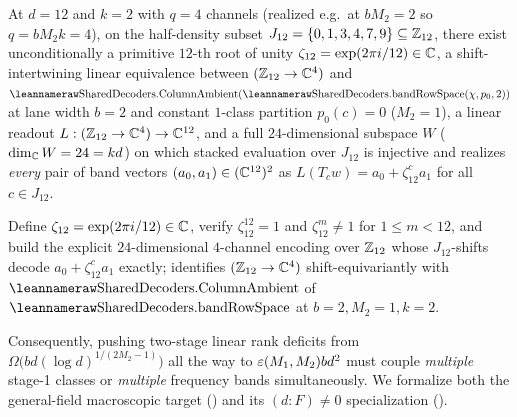 \begin{example}[Unconditional $d = 12$ single-class band witness over $\C$]\label{ex:d12-band}
At $d = 12$ and $k = 2$ with $q = 4$ channels (realized e.g.\ at $b M_2 = 2$ so $q = b M_2 k = 4$),
on the half-density subset $J_{12} = \{0, 1, 3, 4, 7, 9\} \subseteq \mathbb{Z}_{12}$, there exist
unconditionally a primitive $12$-th root of unity $\zeta_{12} = \exp(2\pi i / 12) \in \mathbb{C}$, a
shift-intertwining linear equivalence between $(\mathbb{Z}_{12} \to \mathbb{C}^4)$ and
$\leanname{SharedDecoders.ColumnAmbient}(\leanname{SharedDecoders.bandRowSpace}(\chi, p_0, 2))$
at lane width $b = 2$ and constant $1$-class partition $p_0(c) = 0$ ($M_2 = 1$), a linear readout
$L : (\mathbb{Z}_{12} \to \mathbb{C}^4) \to \mathbb{C}^{12}$, and a full $24$-dimensional subspace $W$ ($\dim_{\mathbb{C}} W = 24 =
kd$) on which stacked evaluation over $J_{12}$ is injective and realizes \emph{every} pair of band
vectors $(a_0, a_1) \in (\mathbb{C}^{12})^2$ as $L(T_c w) = a_0 + \zeta_{12}^c a_1$ for all $c \in J_{12}$.
\end{example}
\begin{outline}
Define $\zeta_{12} = \exp(2\pi i / 12) \in \mathbb{C}$, verify $\zeta_{12}^{12} = 1$ and $\zeta_{12}^m \ne 1$
for $1 \le m < 12$, and build the explicit $24$-dimensional $4$-channel encoding over $\mathbb{Z}_{12}$
whose $J_{12}$-shifts decode $a_0 + \zeta_{12}^c a_1$ exactly;
 identifies $(\mathbb{Z}_{12} \to \mathbb{C}^4)$ shift-equivariantly with
$\leanname{SharedDecoders.ColumnAmbient}$ of $\leanname{SharedDecoders.bandRowSpace}$ at
$b = 2, M_2 = 1, k = 2$.
\end{outline}

Consequently, pushing two-stage linear rank deficits from $\Omega\bigl(bd(\log d)^{1/(2M_2-1)}\bigr)$
all the way to $\varepsilon(M_1, M_2) b d^2$ must couple \emph{multiple} stage-1 classes or \emph{multiple}
frequency bands simultaneously. We formalize both the general-field macroscopic target
() and its $(d : F) \ne 0$ specialization
().

